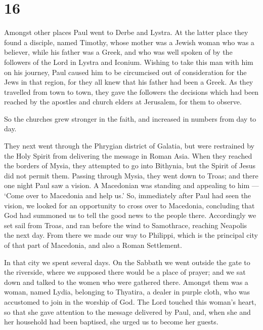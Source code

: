 \hypertarget{section-15}{%
\section{16}\label{section-15}}

 Amongst other places Paul went to Derbe and Lystra. At the
latter place they found a disciple, named Timothy, whose mother was a
Jewish woman who was a believer, while his father was a Greek,
 and who was well spoken of by the followers of the Lord in
Lystra and Iconium.  Wishing to take this man with him on
his journey, Paul caused him to be circumcised out of consideration for
the Jews in that region, for they all knew that his father had been a
Greek.  As they travelled from town to town, they gave the
followers the decisions which had been reached by the apostles and
church elders at Jerusalem, for them to observe.

 So the churches grew stronger in the faith, and increased
in numbers from day to day.

 They next went through the Phrygian district of Galatia,
but were restrained by the Holy Spirit from delivering the message in
Roman Asia.  When they reached the borders of Mysia, they
attempted to go into Bithynia, but the Spirit of Jesus did not permit
them.  Passing through Mysia, they went down to Troas;
 and there one night Paul saw a vision. A Macedonian was
standing and appealing to him --- `Come over to Macedonia and help us.'
 So, immediately after Paul had seen the vision, we looked
for an opportunity to cross over to Macedonia, concluding that God had
summoned us to tell the good news to the people there. 
Accordingly we set sail from Troas, and ran before the wind to
Samothrace, reaching Neapolis the next day.  From there we
made our way to Philippi, which is the principal city of that part of
Macedonia, and also a Roman Settlement.

In that city we spent several days.  On the Sabbath we went
outside the gate to the riverside, where we supposed there would be a
place of prayer; and we sat down and talked to the women who were
gathered there.  Amongst them was a woman, named Lydia,
belonging to Thyatira, a dealer in purple cloth, who was accustomed to
join in the worship of God. The Lord touched this woman's heart, so that
she gave attention to the message delivered by Paul,  and,
when she and her household had been baptised, she urged us to become her
guests.

